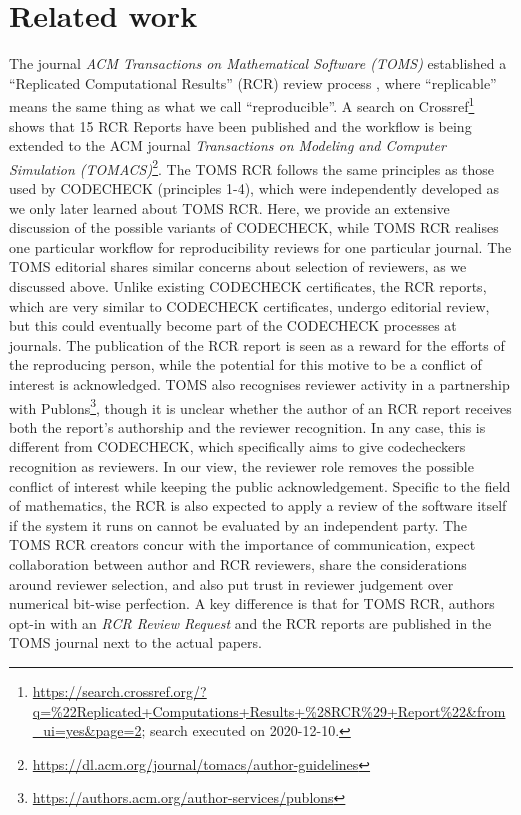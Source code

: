 \documentclass[12pt]{article}
\begin{document}
\section*{Related work}\label{related-work}

The journal \emph{ACM Transactions on Mathematical Software (TOMS)} 
established a ``Replicated Computational Results'' (RCR) review process
\cite{heroux_editorial_2015}, where ``replicable'' means the same thing as what we call ``reproducible''.
A search on Crossref\footnote{\url{https://search.crossref.org/?q=\%22Replicated+Computations+Results+\%28RCR\%29+Report\%22&from_ui=yes&page=2}; search executed
on 2020-12-10.} shows that 15 RCR Reports have been published and the 
workflow is being
extended to the ACM journal \emph{Transactions on Modeling and Computer 
Simulation (TOMACS)}\footnote{\url{https://dl.acm.org/journal/tomacs/author-guidelines}}.
The TOMS RCR follows the same principles as those used by CODECHECK (principles 1-4), which were independently developed as we only later learned about TOMS RCR.
Here, we provide an extensive discussion of the possible variants of CODECHECK,
while TOMS RCR realises one particular workflow for reproducibility 
reviews for one particular journal. The TOMS editorial
\cite{heroux_editorial_2015} shares similar concerns about
selection of reviewers, as we discussed above. Unlike existing CODECHECK certificates, 
the RCR reports, which are very similar to CODECHECK certificates, undergo editorial review, but this could eventually become
part of the CODECHECK processes at journals.
The publication of the RCR report is seen as a reward for the efforts of
the reproducing person, while the potential for this motive to be a conflict of interest is acknowledged.
TOMS also recognises reviewer activity in a 
partnership with Publons\footnote{
\url{https://authors.acm.org/author-services/publons}},
though it is unclear whether the author of an RCR report receives both the report's
authorship and the reviewer recognition. In any case, this is different
from CODECHECK, which specifically aims to give codecheckers recognition as reviewers.
In our view, the reviewer role removes the possible conflict of interest while
keeping the public acknowledgement.
Specific to the field of mathematics, the RCR is also expected to apply a
review of the software itself if the system it runs on cannot be evaluated by
an independent party.
The TOMS RCR creators concur with the importance of communication, expect
collaboration between author and RCR reviewers,
share the considerations around reviewer selection, and also put trust
in reviewer judgement over numerical bit-wise perfection.
A key difference is that for TOMS RCR, authors opt-in with an \emph{RCR Review Request} and
the RCR reports are published in the TOMS journal next to the actual papers.
\end{document}
